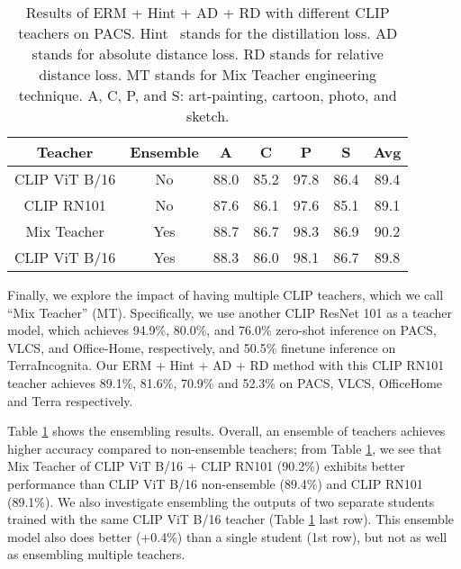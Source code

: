 \documentclass[10pt,twocolumn,letterpaper]{article}
\begin{document}
\begin{table}[htbp]
\begin{center}
\footnotesize
\begin{tabular}{c |  c | c|c|c|c|c }
\hline
 Teacher & Ensemble & A & C & P & S & Avg \\
\hline \hline
CLIP ViT B/16 & No & 88.0 & 85.2 & 97.8 & 86.4 & 89.4\\
CLIP RN101 & No & 87.6 & 86.1 & 97.6 & 85.1 & 89.1\\
\rowcolor{lightgray!30}Mix Teacher & Yes & 88.7 & 86.7 & 98.3 & 86.9 & 90.2\\
CLIP ViT B/16 & Yes & 88.3 & 86.0 & 98.1 & 86.7 & 89.8\\

\hline 
\end{tabular}
\vspace{5pt}
\caption{Results of ERM + Hint + AD + RD with different CLIP teachers on PACS. Hint~\cite{hinton2015distilling} stands for the distillation loss. AD stands for absolute distance loss. RD stands for relative distance loss. MT stands for Mix Teacher engineering technique. A, C, P, and S: art-painting, cartoon, photo, and sketch.}
\label{table:mixteacher}
\end{center}
\end{table}

Finally, we explore the impact of having multiple CLIP teachers, which we call ``Mix Teacher'' (MT).  Specifically, we use another CLIP ResNet 101 as a teacher model, which achieves 94.9\%, 80.0\%, and 76.0\% zero-shot inference on PACS, VLCS, and Office-Home, respectively, and 50.5\% finetune inference on TerraIncognita.  Our ERM + Hint + AD + RD method with this CLIP RN101 teacher achieves 89.1\%, 81.6\%, 70.9\% and 52.3\% on PACS, VLCS, OfficeHome and Terra respectively. 

Table \ref{table:mixteacher} shows the ensembling results.  Overall, an ensemble of teachers achieves higher accuracy compared to non-ensemble teachers; from Table \ref{table:mixteacher}, we see that Mix Teacher of CLIP ViT B/16 + CLIP RN101 (90.2\%) exhibits better performance than CLIP ViT B/16 non-ensemble (89.4\%) and CLIP RN101 (89.1\%). We also investigate ensembling the outputs of two separate students trained with the same CLIP ViT B/16 teacher (Table \ref{table:mixteacher} last row). This ensemble model also does better (+0.4\%) than a single student (1st row), but not as well as ensembling multiple teachers.  
\end{document}
